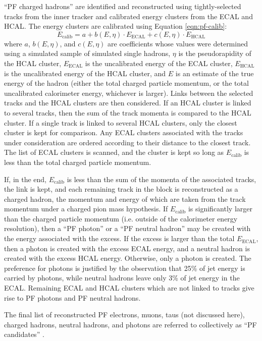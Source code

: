``PF charged hadrons'' are identified and reconstructed using tightly-selected
tracks from the inner tracker and calibrated energy clusters from the ECAL and HCAL.
The energy clusters are calibrated using Equation \ref{eqn:pf-calib}:
\begin{equation}
  E_{\text{calib}} = a + b(E,\eta)\cdot E_{\text{ECAL}} + c(E,\eta)\cdot E_{\text{HCAL}}
  \label{eqn:pf-calib}
\end{equation}
where $a$, $b(E,\eta)$, and $c(E,\eta)$ are coefficients whose values
were determined using a simulated sample of simulated single hadrons, $\eta$ is the 
pseudorapidity of the HCAL cluster,
$E_{\text{ECAL}}$ is the uncalibrated energy of the ECAL cluster,
$E_{\text{HCAL}}$ is the uncalibrated energy of the HCAL cluster, and 
$E$ is an estimate of the true energy of the hadron (either the total charged particle momentum, or the 
total uncalibrated calorimeter energy, whichever is larger).
Links between the selected tracks
and the HCAL clusters are then considered.  If an HCAL cluster is linked to
several tracks, then the sum of the track momenta is compared to the HCAL cluster.
If a single track is linked to several HCAL clusters, only the closest cluster
is kept for comparison.  Any ECAL clusters associated with the tracks under consideration
are ordered according to their distance to the closest track.  The list of ECAL clusters is 
scanned, and the cluster is kept so long as $E_{\text{calib}}$ is less than the total charged
particle momentum.

If, in the end, $E_{\text{calib}}$ is less than the sum of the momenta of the associated tracks,
the link is kept, and each remaining track in the block is reconstructed as a charged hadron,
the momentum and energy of which are taken from the track momentum under a charged pion 
mass hypothesis.  If $E_{\text{calib}}$ is significantly larger than the charged particle momentum 
(i.e. outside of the calorimeter energy resolution), then a ``PF photon'' or a 
``PF neutral hadron'' may be created with the energy associated with the excess.
If the excess is larger than the total $E_{\text{ECAL}}$, then a photon is created with the 
excess ECAL energy, and a neutral hadron is created with the excess HCAL energy.
Otherwise, only a photon is created.  The preference for photons is justified by the observation
that 25\% of jet energy is carried by photons, while neutral hadrons leave only 3\% of jet
energy in the ECAL.
Remaining ECAL and HCAL clusters which are not linked to tracks
give rise to PF photons and PF neutral hadrons.

The final list of reconstructed PF electrons, muons, taus (not discussed here),
charged hadrons, neutral hadrons, and photons are referred to collectively as 
``PF candidates'' \cite{pf-1}.
